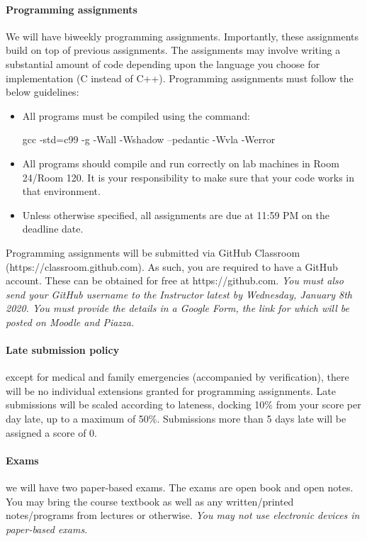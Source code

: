 \documentclass{article}
\begin{document}
\paragraph{Programming assignments} 
We will have biweekly programming assignments. 
Importantly, these assignments build on top of previous assignments. 
The assignments may involve writing a substantial amount of code depending upon the language you choose for implementation (C instead of C++). 
Programming assignments must follow the below guidelines:
\begin{itemize}
\item \begin{flushleft}All programs must be compiled using the command:\end{flushleft} \linebreak gcc -std=c99 -g -Wall -Wshadow --pedantic -Wvla -Werror
\item All programs should compile and run correctly on lab machines in Room 24/Room 120. It is your responsibility to make sure that your code works in that environment.
\item Unless otherwise specified, all assignments are due at 11:59 PM on the deadline date.
\end{itemize}

Programming assignments will be submitted via GitHub Classroom (https://classroom.github.com). As such, you are required to have a GitHub account. These can be obtained for free at https://github.com.
{\em You must also send your GitHub username to the Instructor latest by Wednesday, January 8th 2020. You must provide the details in a Google Form, the link for which will be posted on Moodle and Piazza. }

\paragraph{Late submission policy} except for medical and family emergencies (accompanied by verification), there will be no individual extensions granted for programming assignments. Late submissions will be scaled according to lateness, docking 10\% from your score per day late, up to a maximum of 50\%. Submissions more than 5 days late will be assigned a score of 0.

\paragraph{Exams} we will have two paper-based exams. 
The exams are open book and open notes. 
You may bring the course textbook as well as any written/printed notes/programs from lectures or otherwise. 
{\em You may not use electronic devices in paper-based exams}.
\end{document}
